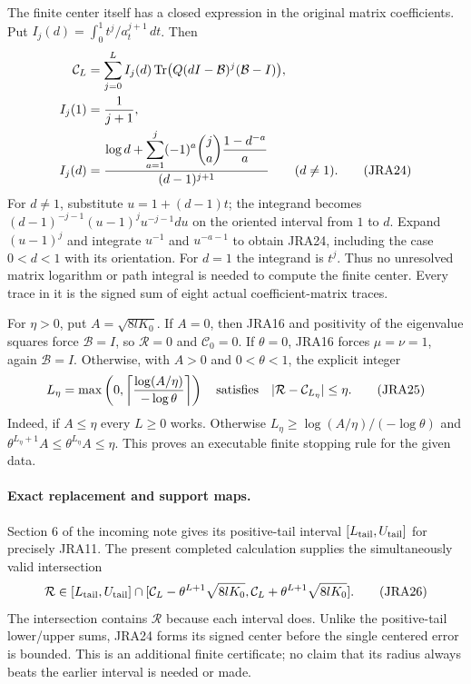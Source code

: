 \documentclass[11pt,a4paper]{article}
\newcommand{\Tr}{\operatorname{Tr}}
\begin{document}
The finite center itself has a closed expression in the original
matrix coefficients. Put $I_j(d)=\int_0^1t^j/a_t^{j+1}\,dt$. Then
\begin{align}
 \mathcal C_L
 &=\sum_{j=0}^L I_j(d)\Tr\bigl(Q(dI-\mathcal B)^j(\mathcal B-I)\bigr),\notag\\
 I_j(1)&=\frac1{j+1},\notag\\
 I_j(d)&=\frac{\displaystyle\log d+
       \sum_{a=1}^j(-1)^a\binom ja\frac{1-d^{-a}}a}
       {(d-1)^{j+1}}\qquad(d\ne1).
 \tag{JRA24}
\end{align}
For $d\ne1$, substitute $u=1+(d-1)t$; the integrand becomes
$(d-1)^{-j-1}(u-1)^ju^{-j-1}du$ on the oriented interval from $1$ to $d$.
Expand $(u-1)^j$ and integrate $u^{-1}$ and $u^{-a-1}$ to obtain JRA24,
including the case $0<d<1$ with its orientation. For $d=1$ the integrand
is $t^j$. Thus no unresolved matrix logarithm or path integral is needed
to compute the finite center. Every trace in it is the signed sum of
eight actual coefficient-matrix traces.

For $\eta>0$, put $A=\sqrt{8lK_0}$. If $A=0$, then JRA16 and positivity
of the eigenvalue squares force $\mathcal B=I$, so $\mathcal R=0$ and
$\mathcal C_0=0$. If $\theta=0$, JRA16 forces $\mu=\nu=1$, again
$\mathcal B=I$. Otherwise, with $A>0$ and $0<\theta<1$, the explicit
integer
\begin{equation}
 L_\eta=\max\left(0,
       \left\lceil\frac{\log(A/\eta)}{-\log\theta}\right\rceil\right)
 \quad\hbox{satisfies}\quad
 |\mathcal R-\mathcal C_{L_\eta}|\leq\eta.
 \tag{JRA25}
\end{equation}
Indeed, if $A\leq\eta$ every $L\geq0$ works. Otherwise
$L_\eta\geq\log(A/\eta)/(-\log\theta)$ and
$\theta^{L_\eta+1}A\leq\theta^{L_\eta}A\leq\eta$.
This proves an executable finite stopping rule for the given data.

\paragraph{Exact replacement and support maps.}
Section 6 of the incoming note gives its positive-tail interval
$[L_{\rm tail},U_{\rm tail}]$ for precisely JRA11. The present completed
calculation supplies the simultaneously valid intersection
\begin{equation}
 \mathcal R\in[L_{\rm tail},U_{\rm tail}]
 \cap[\mathcal C_L-\theta^{L+1}\sqrt{8lK_0},
       \mathcal C_L+\theta^{L+1}\sqrt{8lK_0}].
 \tag{JRA26}
\end{equation}
The intersection contains $\mathcal R$ because each interval does.
Unlike the positive-tail lower/upper sums, JRA24 forms its signed center
before the single centered error is bounded. This is an additional
finite certificate; no claim that its radius always beats the earlier
interval is needed or made.
\end{document}
